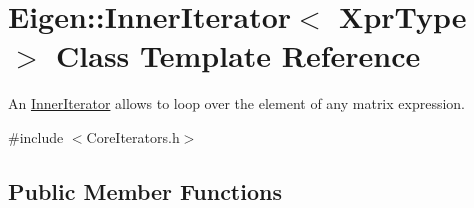 \hypertarget{class_eigen_1_1_inner_iterator}{}\section{Eigen\+:\+:Inner\+Iterator$<$ Xpr\+Type $>$ Class Template Reference}
\label{class_eigen_1_1_inner_iterator}


An \hyperlink{class_eigen_1_1_inner_iterator}{Inner\+Iterator} allows to loop over the element of any matrix expression.  




{\ttfamily \#include $<$Core\+Iterators.\+h$>$}

\subsection*{Public Member Functions}
